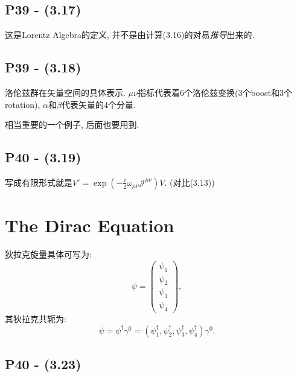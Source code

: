 \documentclass[10pt,b5paper,openany]{book}
\begin{document}
\subsection{P39 - (3.17)}

这是Lorentz Algebra的定义, 并不是由计算(3.16)的对易\textit{推导}出来的. 

\subsection{P39 - (3.18)}

洛伦兹群在矢量空间的具体表示. $\mu\nu$指标代表着6个洛伦兹变换(3个boost和3个rotation), $\alpha$和$\beta$代表矢量的4个分量. 

相当重要的一个例子, 后面也要用到. 

\begin{center}
\end{center}

\subsection{P40 - (3.19)}

写成有限形式就是$V' = \exp{(-\frac{i}{2}\omega_{\mu\nu}\mathcal{J}^{\mu\nu})}V$. (对比(3.13))

\section{The Dirac Equation}

狄拉克旋量具体可写为:  
\begin{equation}
  \psi = \left( \begin{array}{c} \psi_1 \\ \psi_2 \\ \psi_3 \\ \psi_4 \end{array} \right), 
\end{equation}
其狄拉克共轭为: 
\begin{equation}
  \overline{\psi} = \psi^\dagger \gamma^0 = (\psi^\dagger_1, \psi^\dagger_2, \psi^\dagger_3, \psi^\dagger_4)\gamma^0. 
\end{equation}

\subsection{P40 - (3.23)}
\end{document}
